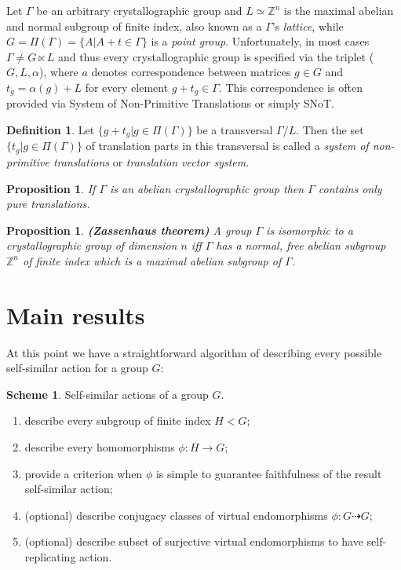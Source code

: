 \documentclass[a4paper,12pt]{amsart}
\newtheorem{proposition}[theorem]{Proposition}
\theoremstyle{definition}
\newtheorem{definition}{Definition}
\newtheorem{algorithm}{Scheme}
\begin{document}
	
	Let $\Gamma$ be an arbitrary crystallographic group and $L \simeq \mathbb{Z}^n$ is the maximal abelian and normal subgroup of finite index, also known as a $\Gamma$'s \textit{lattice}, while $G = \Pi(\Gamma) =  \{A | A + t \in \Gamma\}$ is a \textit{point group}. Unfortunately, in most cases $\Gamma \neq G \ltimes L$ and thus every crystallographic group is specified via the triplet ($G, L, \alpha$), where $a$ denotes correspondence between matrices $g \in G$ and $t_g = \alpha(g) + L$ for every element $g + t_g \in \Gamma.$ This correspondence is often provided via System of Non-Primitive Translations or simply SNoT. 
	
	\begin{definition}
		Let $\{g + t_g | g \in \Pi(\Gamma)\}$ be a transversal $\Gamma / L$. Then the set $\{t_g | g \in \Pi(\Gamma)\}$ of translation parts in this transversal is called a \textit{system of non-primitive translations} or \textit{translation vector system}.  
	\end{definition}
		
	\begin{proposition}
	
		If $\Gamma$ is an abelian crystallographic group then $\Gamma$ contains only pure translations.  	
		
	\end{proposition}

	\begin{proposition}
		\textbf{(Zassenhaus theorem)} A group $\Gamma$ is isomorphic to a crystallographic group of dimension $n$ iff $\Gamma$ has a normal, free abelian subgroup $\mathbb{Z}^n$ of finite index which is a maximal abelian subgroup of $\Gamma$.	
	
	\end{proposition}
	\newpage	
	\section{Main results}\label{section: main results}
	
	
	
	At this point we have a straightforward algorithm of describing every possible self-similar action for a group $G$: 
	
	
	\begin{algorithm}  Self-similar actions of a group $G$.
		
	\begin{enumerate}[label=\arabic*.]
		\item describe every subgroup of finite index $H < G$; 
		\item describe every homomorphisms $\phi : H \rightarrow G$;
		\item provide a criterion when $\phi$ is simple to guarantee faithfulness of the result self-similar action;
		\item (optional) describe conjugacy classes of virtual endomorphisms $\phi: G \dashrightarrow G$;
		\item (optional) describe subset of surjective virtual endomorphisms to have self-replicating action.
	\end{enumerate}
		
	\end{algorithm}
	
\end{document}

